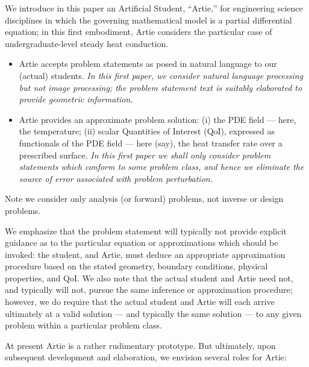 \documentclass[preprint,12pt]{article}
\begin{document}
We introduce in this paper an Artificial Student, ``Artie,'' for engineering science disciplines in which the governing mathematical model is a partial differential equation; in this first embodiment, Artie considers the particular case of undergraduate-level steady heat conduction. 
\begin{itemize}
\item[] Artie accepts problem statements as posed in natural language to our (actual) students. {\em In this first paper, we consider natural language processing but not image processing; the problem statement text is suitably elaborated to provide geometric information.} 
\item[] Artie provides an approximate problem solution: (i)  the PDE field --- here, the temperature; (ii) scalar Quantities of Interest (QoI), expressed as functionals of the PDE field  --- here (say), the heat transfer rate over a prescribed surface. {\em In this first paper we shall only consider problem statements which conform to some problem class, and hence we eliminate the source of error associated with problem perturbation.}
 \end{itemize}
Note we consider only analysis (or forward) problems, not inverse or design problems.
 
We emphasize that the problem statement will typically not provide explicit guidance as to the particular equation or approximations which should be invoked: the student, and Artie, must deduce an appropriate approximation procedure based on the stated geometry, boundary conditions, physical properties, and QoI. We also note that the actual student and Artie need not, and typically will not, pursue the same inference or approximation procedure; however, we do require that the actual student and Artie will each arrive ultimately at a valid solution --- and typically the same solution --- to any given problem within a particular problem class.

At present Artie is a rather rudimentary prototype. But ultimately, upon subsequent development and elaboration, we envision several roles for Artie:
\end{document}
